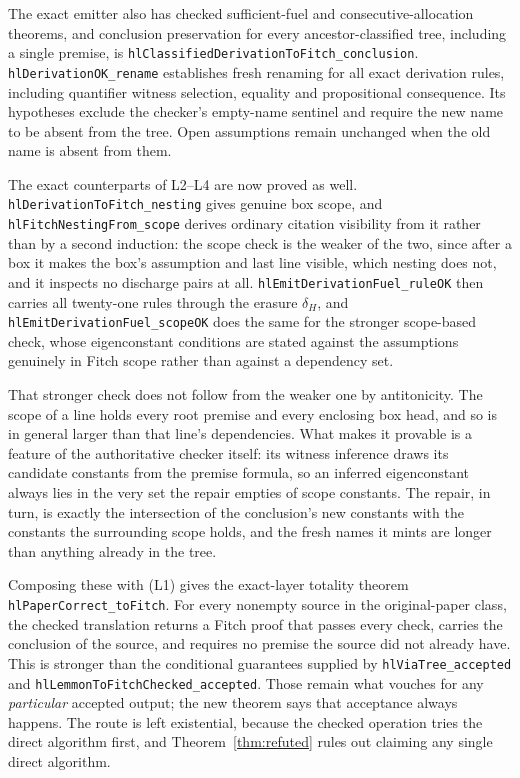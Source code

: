 \documentclass[11pt]{article}
\theoremstyle{plain}
\theoremstyle{definition}
\theoremstyle{remark}
\begin{document}
The exact emitter also has checked sufficient-fuel and consecutive-allocation
theorems, and conclusion preservation for every ancestor-classified tree,
including a single premise, is
\verb|hlClassifiedDerivationToFitch_conclusion|.
\verb|hlDerivationOK_rename| establishes fresh renaming for all exact
derivation rules, including quantifier witness selection, equality and
propositional consequence. Its hypotheses exclude the checker's empty-name
sentinel and require the new name to be absent from the tree. Open assumptions
remain unchanged when the old name is absent from them.

The exact counterparts of L2--L4 are now proved as well.
\verb|hlDerivationToFitch_nesting| gives genuine box scope, and
\verb|hlFitchNestingFrom_scope| derives ordinary citation visibility from it
rather than by a second induction: the scope check is the weaker of the two,
since after a box it makes the box's assumption and last line visible, which
nesting does not, and it inspects no discharge pairs at all.
\verb|hlEmitDerivationFuel_ruleOK| then carries all twenty-one rules through
the erasure $\delta_H$, and \verb|hlEmitDerivationFuel_scopeOK| does the same
for the stronger scope-based check, whose eigenconstant conditions are stated
against the assumptions genuinely in Fitch scope rather than against a
dependency set.

That stronger check does not follow from the weaker one by antitonicity. The
scope of a line holds every root premise and every enclosing box head, and so
is in general larger than that line's dependencies. What makes it provable is
a feature of the authoritative checker itself: its witness inference draws its
candidate constants from the premise formula, so an inferred eigenconstant
always lies in the very set the repair empties of scope constants. The repair,
in turn, is exactly the intersection of the conclusion's new constants with the
constants the surrounding scope holds, and the fresh names it mints are longer
than anything already in the tree.

Composing these with (L1) gives the exact-layer totality theorem
\verb|hlPaperCorrect_toFitch|. For every nonempty source in the
original-paper class, the checked translation returns a Fitch proof that
passes every check, carries the conclusion of the source, and requires no
premise the source did not already have. This is stronger than the
conditional guarantees supplied by \verb|hlViaTree_accepted| and
\verb|hlLemmonToFitchChecked_accepted|. Those remain what vouches for any
\emph{particular} accepted output; the new theorem says that acceptance
always happens. The route is left existential, because the checked operation
tries the direct algorithm first, and Theorem~\ref{thm:refuted} rules out
claiming any single direct algorithm.
\end{document}
